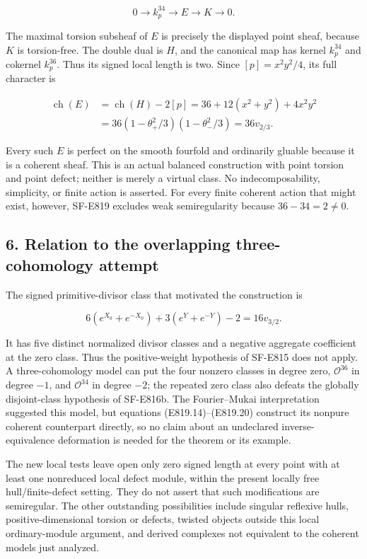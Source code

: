 \[
 0\longrightarrow k_p^{34}\longrightarrow E\longrightarrow K
          \longrightarrow0.
 \tag{E819.19}
\]

The maximal torsion subsheaf of \(E\) is precisely the displayed point
sheaf, because \(K\) is torsion-free. The double dual is \(H\), and the
canonical map has kernel \(k_p^{34}\) and cokernel \(k_p^{36}\). Thus
its signed local length is two. Since \([p]=x^2y^2/4\), its full
character is

\[
 \begin{split}
 \operatorname{ch}(E)
  &=\operatorname{ch}(H)-2[p]
    =36+12(x^2+y^2)+4x^2y^2\\
  &=36(1-\theta_+^2/3)(1-\theta_-^2/3)
    =36v_{2/3}.
 \end{split}
 \tag{E819.20}
\]

Every such \(E\) is perfect on the smooth fourfold and ordinarily
gluable because it is a coherent sheaf. This is an actual balanced
construction with point torsion and point defect; neither is merely a
virtual class. No indecomposability, simplicity, or finite action is
asserted. For every finite coherent action that might exist, however,
SF-E819 excludes weak semiregularity because \(36-34=2\ne0\).

\subsection{6. Relation to the overlapping three-cohomology
attempt}\label{SF-E819-relation-to-the-overlapping-three-cohomology-attempt}

The signed primitive-divisor class that motivated the construction is

\[
 6(e^{X_0}+e^{-X_0})+3(e^Y+e^{-Y})-2
        =16v_{3/2}.
 \tag{E819.21}
\]

It has five distinct normalized divisor classes and a negative aggregate
coefficient at the zero class. Thus the positive-weight hypothesis of
SF-E815 does not apply. A three-cohomology model can put the four
nonzero classes in degree zero, \(\mathcal O^{36}\) in degree \(-1\),
and \(\mathcal O^{34}\) in degree \(-2\); the repeated zero class also
defeats the globally disjoint-class hypothesis of SF-E816b. The
Fourier--Mukai interpretation suggested this model, but equations
(E819.14)--(E819.20) construct its nonpure coherent counterpart
directly, so no claim about an undeclared inverse-equivalence
deformation is needed for the theorem or its example.

The new local tests leave open only zero signed length at every point
with at least one nonreduced local defect module, within the present
locally free hull/finite-defect setting. They do not assert that such
modifications are semiregular. The other outstanding possibilities
include singular reflexive hulls, positive-dimensional torsion or
defects, twisted objects outside this local ordinary-module argument,
and derived complexes not equivalent to the coherent models just
analyzed.
